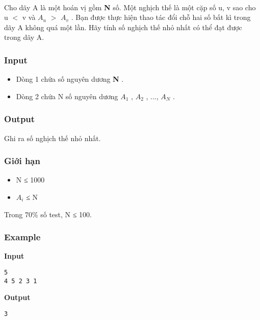 

 

Cho dãy A là một hoán vị gồm \textbf{ N } số. Một nghịch thế là một cặp số u, v sao cho u $<$ v và $A_{u}$ $>$ $A_{v}$ . Bạn được thực hiện thao tác đổi chỗ hai số bất kì trong dãy A không quá một lần. Hãy tính số nghịch thế nhỏ nhất có thể đạt được trong dãy A.

\subsubsection{Input}
\begin{itemize}
	\item Dòng 1 chứa số nguyên dương \textbf{ N } .
	\item Dòng 2 chứa N số nguyên dương \textbf{ $A_{1}$} , \textbf{ $A_{2}$} , ..., \textbf{ $A_{N}$} .
\end{itemize}

\subsubsection{Output}

Ghi ra số nghịch thế nhỏ nhất.

\subsubsection{Giới hạn}
\begin{itemize}
	\item N ≤ 1000
	\item $A_{i}$ ≤ N
\end{itemize}

Trong 70\% số test, N ≤ 100.

\subsubsection{Example}

\textbf{Input }
\begin{verbatim}
5
4 5 2 3 1\end{verbatim}

\textbf{Output }
\begin{verbatim}
3\end{verbatim}
